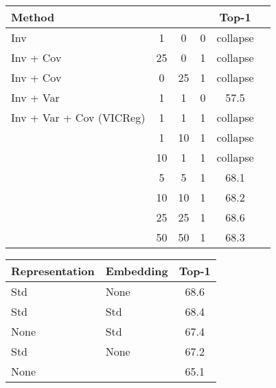 \documentclass{article}
\newcommand{\algo}{VICReg}
\begin{document}
\def \hfillx {\hspace*{-\textwidth} \hfill}
\begin{table}[t]
\small
\begin{minipage}[c]{0.49\textwidth}
\centering
    \vspace{-1.5mm}
\label{tab:impact_varcov}
    \setlength\tabcolsep{3.5pt}
    \small
    \vspace{0.1mm}
    \begin{tabular}{lccccc}
    \toprule
    Method &  &  &  & Top-1  \\
    \midrule
    Inv                         & 1     & 0     & 0     & collapse \\
    Inv + Cov                   & 25    & 0     & 1     & collapse \\
    Inv + Cov                   & 0     & 25    & 1     & collapse \\
    Inv + Var                   & 1     & 1     & 0     & 57.5 \\
    \midrule
    Inv + Var + Cov (\algo)     & 1     & 1	    & 1	    & collapse \\
                                & 1	    & 10	& 1	    & collapse \\
                                & 10	& 1	    & 1	    & collapse \\
                                & 5	    & 5	    & 1	    & 68.1 \\
                                & 10	& 10	& 1	    & 68.2 \\
                                & 25    & 25    & 1     & 68.6 \\
                                & 50	& 50	& 1	    & 68.3 \\
    \bottomrule
    \end{tabular}
\end{minipage}
\hfillx
\begin{minipage}[c]{0.49\textwidth}
\centering
    \vspace{-1.5mm}
    \label{tab:impact_norm}
    \small
    \begin{tabular}{llc}
    \toprule
    Representation & Embedding & Top-1  \\
    \midrule
Std  & None  & 68.6 \\
    Std  & Std & 68.4 \\
    None & Std  & 67.4 \\
    Std & None & 67.2 \\
    None  &  & 65.1 \\
    \bottomrule
    \end{tabular}
\end{minipage}
\end{table}
\end{document}
